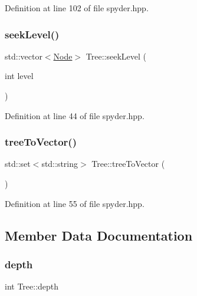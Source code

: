 Definition at line 102 of file spyder.\+hpp.

\mbox{\label{class_tree_a5f27896a82db339aa51367b16e943075}} 
\subsubsection{\texorpdfstring{seek\+Level()}{seekLevel()}}
{\footnotesize\ttfamily std\+::vector$<$\hyperlink{class_node}{Node}$>$ Tree\+::seek\+Level (\begin{DoxyParamCaption}\item[{int}]{level }\end{DoxyParamCaption})\hspace{0.3cm}{\ttfamily [inline]}}



Definition at line 44 of file spyder.\+hpp.

\mbox{\label{class_tree_a1431f9f1aa001db35efbf359529865ee}} 
\subsubsection{\texorpdfstring{tree\+To\+Vector()}{treeToVector()}}
{\footnotesize\ttfamily std\+::set$<$std\+::string$>$ Tree\+::tree\+To\+Vector (\begin{DoxyParamCaption}{ }\end{DoxyParamCaption})\hspace{0.3cm}{\ttfamily [inline]}}



Definition at line 55 of file spyder.\+hpp.



\subsection{Member Data Documentation}
\mbox{\label{class_tree_aee829f12b9755333a0196190fbe07f1b}} 
\subsubsection{\texorpdfstring{depth}{depth}}
{\footnotesize\ttfamily int Tree\+::depth}



